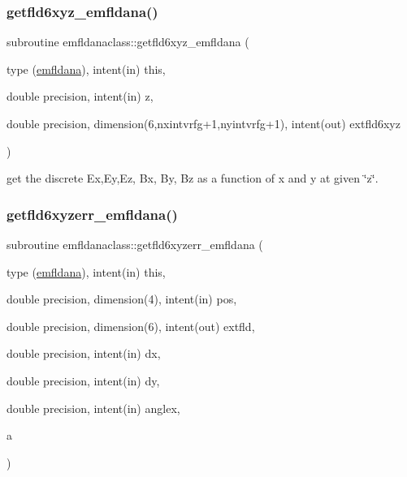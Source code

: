 \subsubsection{\texorpdfstring{getfld6xyz\_emfldana()}{getfld6xyz\_emfldana()}}
{\footnotesize\ttfamily subroutine emfldanaclass\+::getfld6xyz\+\_\+emfldana (\begin{DoxyParamCaption}\item[{type (\mbox{\hyperlink{namespaceemfldanaclass_structemfldanaclass_1_1emfldana}{emfldana}}), intent(in)}]{this,  }\item[{double precision, intent(in)}]{z,  }\item[{double precision, dimension(6,nxintvrfg+1,nyintvrfg+1), intent(out)}]{extfld6xyz }\end{DoxyParamCaption})}



get the discrete Ex,Ey,Ez, Bx, By, Bz as a function of x and y at given \char`\"{}z\char`\"{}. 

\mbox{\label{namespaceemfldanaclass_a0abd49dbf81da65741c9bf08b9900a46}} 
\subsubsection{\texorpdfstring{getfld6xyzerr\_emfldana()}{getfld6xyzerr\_emfldana()}}
{\footnotesize\ttfamily subroutine emfldanaclass\+::getfld6xyzerr\+\_\+emfldana (\begin{DoxyParamCaption}\item[{type (\mbox{\hyperlink{namespaceemfldanaclass_structemfldanaclass_1_1emfldana}{emfldana}}), intent(in)}]{this,  }\item[{double precision, dimension(4), intent(in)}]{pos,  }\item[{double precision, dimension(6), intent(out)}]{extfld,  }\item[{double precision, intent(in)}]{dx,  }\item[{double precision, intent(in)}]{dy,  }\item[{double precision, intent(in)}]{anglex,  }\item[{}]{a }\end{DoxyParamCaption})}

\mbox{\label{namespaceemfldanaclass_abf2e2171f7b0a3aa36462d1965e428f4}} 
